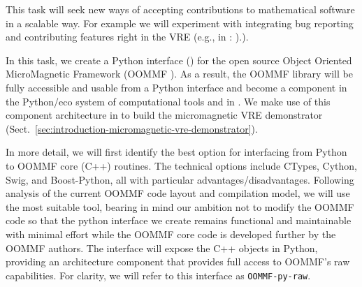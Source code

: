 \begin{workpackage}[id=component-architecture,wphases=0-48!.5,
  title=Component Architecture,lead=UV,
  PSRM=64,UVRM=8,SARM=16, USHRM=4, USORM=6, UBRM=12]
\begin{tasklist}
\begin{task}[title=Improving the development workflow in mathematical software,id=workflow,lead=UV,PM=4]
    This task will seek new ways of accepting contributions to
    mathematical software in a scalable way. For example we will
    experiment with integrating bug reporting and contributing
    features right in the VRE (e.g., in \SMC:
    ).).

  \end{task}


\begin{task}[lead=USO,id=oommf-python-interface,title=Python interface for OOMMF micromagnetic simulation library,PM=6,partners={SA}]
  In this task, we create a Python interface
  () for the open source Object
  Oriented MicroMagnetic Framework (OOMMF \cite{OOMMF-url}).
  As a result, the OOMMF library will be fully accessible and usable
  from a Python interface and become a component in the
  Python/\Jupyter eco system of computational tools and in
  \TheProject. We make use of this component architecture in
   to build the micromagnetic
  VRE demonstrator
  (Sect.~\ref{sec:introduction-micromagnetic-vre-demonstrator}).

  In more detail, we will first identify the best option for interfacing
  from Python to OOMMF core (C++) routines. The technical options
  include CTypes, Cython, Swig, and Boost-Python, all with particular
  advantages/disadvantages. Following analysis of the current OOMMF
  code layout and compilation model, we will use the most suitable
  tool, bearing in mind our ambition not to modify the OOMMF code so
  that the python interface we create remains functional and
  maintainable with minimal effort while the OOMMF core code is
  developed further by the OOMMF authors. 
  The interface will expose the C++ objects in Python, providing
  an architecture component that provides full access to OOMMF's
  raw capabilities. For clarity, we will refer to this interface as
  \texttt{OOMMF-py-raw}. %


\end{task}
\end{tasklist}
\end{workpackage}
